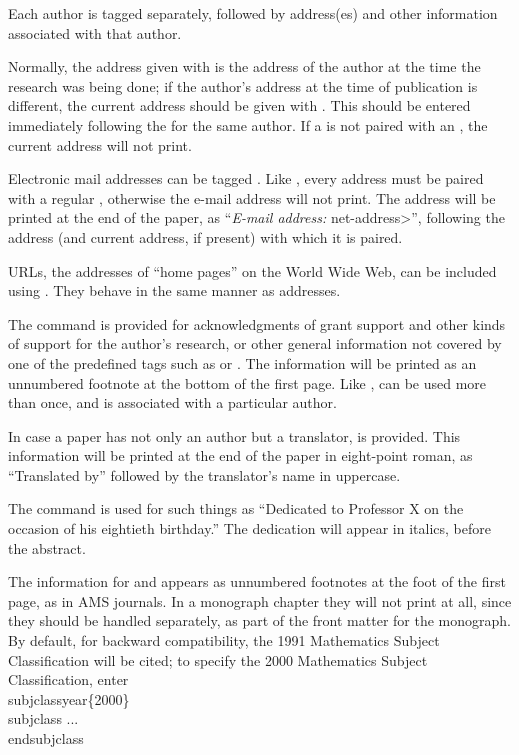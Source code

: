 Each author is tagged separately, followed by address(es) and other
information associated with that author.

Normally, the address given with  is the address of the
author at the time the research was being done; if the author's
address at the time of publication is different, the current address
should be given with .  This should be entered immediately
following the  for the same author.  If a  is
not paired with an , the current address will not print.

Electronic mail addresses can be tagged .
Like , every  address must be paired with a regular
, otherwise the e-mail address will not print.
The  address will be printed at the end of the paper, as
``{\it E-mail address:\/} \<net-address>'', following the address (and
current address, if present) with which it is paired.

URLs, the addresses of ``home pages'' on the World Wide Web, can be
included using .  They behave in the same
manner as  addresses.

The  command is provided for acknowledgments of grant support
and other kinds of support for the author's research, or other general
information not covered by one of the predefined tags such as
 or . The information will be printed as an
unnumbered footnote at the bottom of the first page.  Like ,
 can be used more than once, and is associated with a
particular author.

In case a paper has not only an author but a translator, 
is provided.  This information will be printed at the end of the paper in
eight-point roman, as ``Translated by'' followed by the translator's name
in uppercase.

The  command is used for such things as
``Dedicated to Professor X on the occasion of his eightieth birthday.''
The dedication will appear in italics, before the abstract.

The information for  and  appears as
unnumbered footnotes at the foot of the first page, as in AMS journals.
In a monograph chapter they will not print at all, since they should be
handled separately, as part of the front matter for the monograph.
By default, for backward compatibility, the 1991 Mathematics Subject
Classification will be cited; to specify the 2000 Mathematics Subject
Classification, enter
\beginexample{}
\\subjclassyear\{2000\}
\\subjclass ...\\endsubjclass
\endexample

